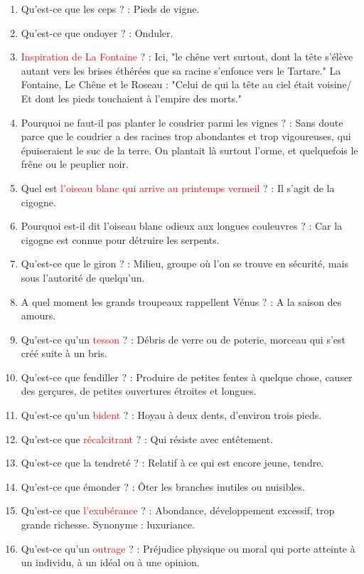 \documentclass[a4paper, 11pt, hidelinks]{article}
\begin{document}
\begin{enumerate}
      \item Qu'est-ce que les ceps ? : Pieds de vigne.
      \item Qu'est-ce que ondoyer ? : Onduler.
      \item \textcolor{red}{Inspiration de La Fontaine} ? : Ici, "le chêne vert surtout, dont la tête s'élève autant vers les brises éthérées
            que sa racine s'enfonce vers le Tartare." La Fontaine, Le Chêne et le Roseau : "Celui de qui la tête au ciel était voisine/
            Et dont les pieds touchaient à l'empire des morts."
      \item Pourquoi ne faut-il pas planter le coudrier parmi les vignes ? : Sans doute parce que le coudrier a des racines trop
            abondantes et trop vigoureuses, qui épuiseraient le suc de la terre. On plantait là surtout l'orme, et quelquefois le frêne
            ou le peuplier noir.
      \item Quel est \textcolor{red}{l'oiseau blanc qui arrive au printemps vermeil} ? : Il s'agit de la cigogne.
      \item Pourquoi est-il dit l'oiseau blanc odieux aux longues couleuvres ? : Car la cigogne est connue pour détruire les serpents.
      \item Qu'est-ce que le giron ? : Milieu, groupe où l'on se trouve en sécurité, mais sous l'autorité de quelqu'un.
      \item A quel moment les grands troupeaux rappellent Vénus ? : A la saison des amours.
      \item Qu'est-ce qu'un \textcolor{red}{tesson} ? : Débris de verre ou de poterie, morceau qui s'est créé suite à un bris.
      \item Qu'est-ce que fendiller ? : Produire de petites fentes à quelque chose, causer des gerçures, de petites ouvertures
            étroites et longues.
      \item Qu'est-ce qu'un \textcolor{red}{bident} ? : Hoyau à deux dents, d'environ trois pieds.
      \item Qu'est-ce que \textcolor{red}{récalcitrant} ? : Qui résiste avec entêtement.
      \item Qu'est-ce que la tendreté ? : Relatif à ce qui est encore jeune, tendre.
      \item Qu'est-ce que émonder ? : Ôter les branches inutiles ou nuisibles.
      \item Qu'est-ce que \textcolor{red}{l'exubérance} ? : Abondance, développement excessif, trop grande richesse. Synonyme : luxuriance.
      \item Qu'est-ce qu'un \textcolor{red}{outrage} ? : Préjudice physique ou moral qui porte atteinte à un individu, à un idéal ou à une opinion.

\end{enumerate}
\end{document}
